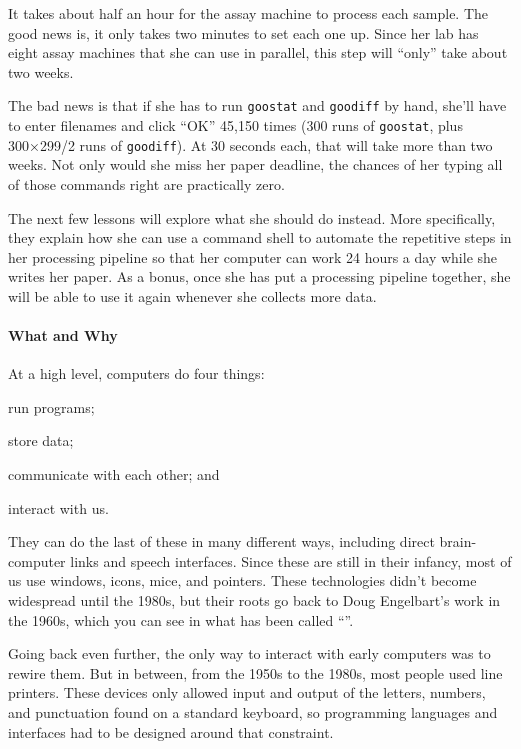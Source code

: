 \documentclass{book}
\begin{document}
It takes about half an hour for the assay machine to process each
sample. The good news is, it only takes two minutes to set each one up.
Since her lab has eight assay machines that she can use in parallel,
this step will ``only'' take about two weeks.

The bad news is that if she has to run \texttt{goostat} and
\texttt{goodiff} by hand, she'll have to enter filenames and click
``OK'' 45,150 times (300 runs of \texttt{goostat}, plus 300×299/2 runs
of \texttt{goodiff}). At 30 seconds each, that will take more than two
weeks. Not only would she miss her paper deadline, the chances of her
typing all of those commands right are practically zero.

The next few lessons will explore what she should do instead. More
specifically, they explain how she can use a command shell to automate
the repetitive steps in her processing pipeline so that her computer can
work 24 hours a day while she writes her paper. As a bonus, once she has
put a processing pipeline together, she will be able to use it again
whenever she collects more data.

\mbox{}\paragraph{What and Why}

At a high level, computers do four things:

\begin{swcitemize}
\item
  run programs;
\item
  store data;
\item
  communicate with each other; and
\item
  interact with us.
\end{swcitemize}

They can do the last of these in many different ways, including direct
brain-computer links and speech interfaces. Since these are still in
their infancy, most of us use windows, icons, mice, and pointers. These
technologies didn't become widespread until the 1980s, but their roots
go back to Doug Engelbart's work in the 1960s, which you can see in what
has been called ``''.

Going back even further, the only way to interact with early computers
was to rewire them. But in between, from the 1950s to the 1980s, most
people used line printers. These devices only allowed input and output
of the letters, numbers, and punctuation found on a standard keyboard,
so programming languages and interfaces had to be designed around that
constraint.
\end{document}

